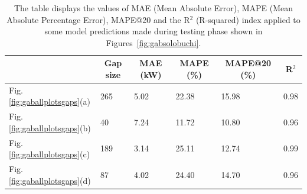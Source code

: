 \begin{table}[H]
	\begin{center}
		\begin{tabular}[c]{l|l|l|l|l|l}
			                                           &
			\multicolumn{1}{c|}{\textbf{Gap size}}     &
			\multicolumn{1}{c|}{\textbf{MAE (kW)}}     &
			\multicolumn{1}{c|}{\textbf{MAPE (\%)}}    &                                   %
			\multicolumn{1}{c|}{\textbf{MAPE@20 (\%)}} &                                   %
			\multicolumn{1}{c}{\textbf{R}$^2$}                                             \\
			\hline

			Fig. \ref{fig:gaballplotsgaps}(a)          & 265 & 5.02 & 22.38 & 15.98 & 0.98 \\
			Fig. \ref{fig:gaballplotsgaps}(b)          & 40  & 7.24 & 11.72 & 10.80 & 0.96 \\
			Fig. \ref{fig:gaballplotsgaps}(c)          & 189 & 3.14 & 25.11 & 12.74 & 0.99 \\
			Fig. \ref{fig:gaballplotsgaps}(d)          & 87  & 4.02 & 24.40 & 14.70 & 0.96 \\
		\end{tabular}
	\end{center}
	\caption{The table displays the values of MAE (Mean Absolute Error), MAPE (Mean Absolute Percentage Error), MAPE@20 and the R$^2$ (R-squared) index applied to some model predictions made during testing phase shown in Figures~\ref{fig:gabsolobuchi}.}\label{tab:gabpmaer}
\end{table}

